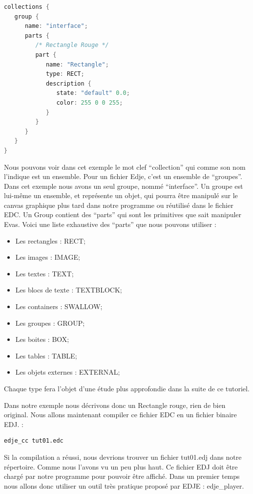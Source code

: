 \documentclass[a4paper]{efr}
\begin{document}
\begin{lstlisting}[language=c]
 collections {
   group {
      name: "interface";
      parts {
         /* Rectangle Rouge */
         part {
            name: "Rectangle";
            type: RECT;
            description {
               state: "default" 0.0;
               color: 255 0 0 255;
            }
         }
      }
   }
}
\end{lstlisting}

Nous pouvons voir dans cet exemple le mot clef ``collection'' qui comme son
nom l'indique est un ensemble. Pour un fichier Edje, c'est un ensemble
de ``groupes''.
Dans cet exemple nous avons un seul groupe, nommé ``interface''.
Un groupe est lui-même un ensemble, et représente un objet, qui pourra être
manipulé sur le canvas graphique plus tard dans notre programme ou réutilisé
dans le fichier EDC.
Un Group contient des ``parts'' qui sont les primitives que sait manipuler Evas.
Voici une liste exhaustive des ``parts'' que nous pouvons utiliser :
\begin{itemize}
\item Les rectangles : RECT;
\item Les images : IMAGE;
\item Les textes : TEXT;
\item Les blocs de texte : TEXTBLOCK;
\item Les containers : SWALLOW;
\item Les groupes : GROUP;
\item Les boites : BOX;
\item Les tables : TABLE;
\item Les objets externes : EXTERNAL;
\end{itemize}
Chaque type fera l'objet d'une étude plus approfondie dans la suite de ce
tutoriel.

Dans notre exemple nous décrivons donc un Rectangle rouge, rien de bien
original. Nous allons maintenant compiler ce fichier EDC en un fichier binaire
EDJ.  :

\begin{lstlisting}
edje_cc tut01.edc
\end{lstlisting}

Si la compilation a réussi, nous devrions trouver un fichier tut01.edj dans notre
répertoire. Comme nous l'avons vu un peu plus haut. Ce fichier EDJ doit être
chargé par notre programme pour pouvoir être affiché. Dans un premier temps nous
allons donc utiliser un outil très pratique proposé par EDJE : edje\_player.
\end{document}

